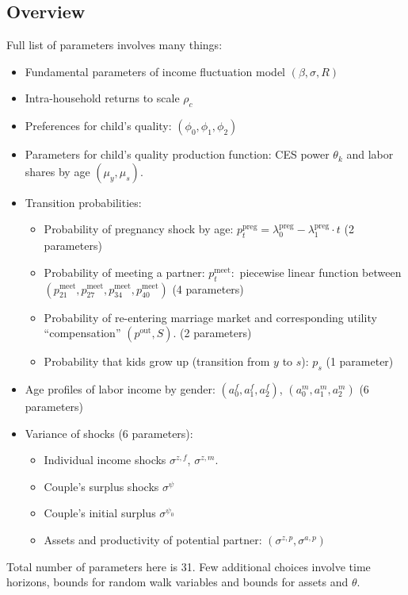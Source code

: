 \documentclass[12pt,letter]{article}
\begin{document}
\subsection{Overview}
Full list of parameters involves many things:
\begin{itemize}
\item Fundamental parameters of income fluctuation model $(\beta,\sigma,R)$
\item Intra-household returns to scale $\rho_c$
\item Preferences for child's quality: $(\phi_0,\phi_1,\phi_2)$
\item Parameters for child's quality production function: CES power $\theta_k$ and labor shares by age $(\mu_y,\mu_s)$.
\item Transition probabilities:
\begin{itemize}
\item Probability of pregnancy shock by age: $p^{\text{preg}}_t = \lambda^{\text{preg}}_0 - \lambda^{\text{preg}}_1\cdot t$ (2 parameters)
\item Probability of meeting a partner: $p^{\text{meet}}_t:$ piecewise linear function between $(p^{\text{meet}}_{21},p^{\text{meet}}_{27},p^{\text{meet}}_{34},p^{\text{meet}}_{40})$ (4 parameters)
\item Probability of re-entering marriage market and corresponding utility ``compensation'' $(p^{\text{out}},S)$. (2 parameters)
\item Probability that kids grow up (transition from $y$ to $s$): $p_s$ (1 parameter)
\end{itemize}
\item Age profiles of labor income by gender: $(a^f_0,a^f_1,a^f_2)$, $(a^m_0,a^m_1,a^m_2)$ (6 parameters)
\item Variance of shocks (6 parameters):
\begin{itemize}
\item Individual income shocks $\sigma^{z,f}$, $\sigma^{z,m}$.
\item Couple's surplus shocks $\sigma^{\psi}$
\item Couple's initial surplus $\sigma^{\psi_0}$
\item Assets and productivity of potential partner: $(\sigma^{z,p},\sigma^{a,p})$
\end{itemize}
\end{itemize}

Total number of parameters here is 31. Few additional choices involve time horizons, bounds for random walk variables and bounds for assets and $\theta$.
\end{document}
